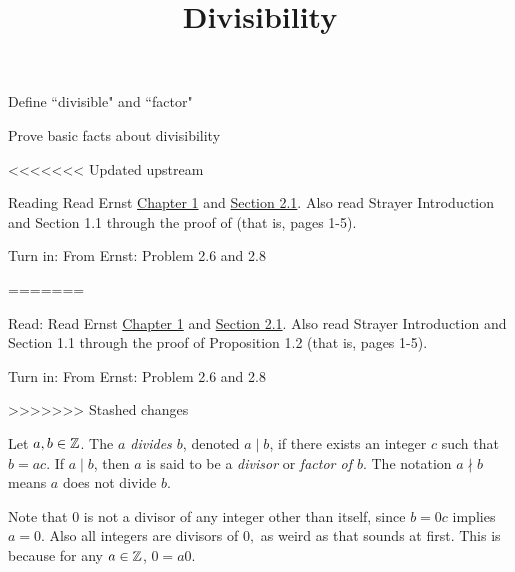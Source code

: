 \documentclass{ximera}
\title{Divisibility}
\begin{document}
\begin{abstract}
\end{abstract}
\maketitle


\begin{obj}
  \item Define ``divisible" and ``factor"
  \item Prove basic facts about divisibility
\end{obj}
 

<<<<<<< Updated upstream
\begin{instructorNotes}
  \begin{pre}
    \item[Reading]  Read Ernst  \href{https://danaernst.com/IBL-IntroToProof/pretext/chap_intro.html}{Chapter 1} and \href{https://danaernst.com/IBL-IntroToProof/pretext/sec_baby_number_theory.html}{Section 2.1}. Also read Strayer Introduction and Section 1.1 through the proof of  (that is, pages 1-5).
  
    \item[Turn in:] From Ernst: Problem 2.6 and 2.8
  \end{pre}
\end{instructorNotes}
=======
\begin{pre}
  \item[Read:]  Read Ernst  \href{https://danaernst.com/IBL-IntroToProof/pretext/chap_intro.html}{Chapter 1} and \href{https://danaernst.com/IBL-IntroToProof/pretext/sec_baby_number_theory.html}{Section 2.1}. Also read Strayer Introduction and Section 1.1 through the proof of Proposition 1.2 (that is, pages 1-5).
  
  \item[Turn in:] From Ernst: Problem 2.6 and 2.8
\end{pre}
>>>>>>> Stashed changes


\begin{defn}[$a$ divides $b$]\label{defn:divides}
  Let $a,b\in \mathbb Z$. The \emph{$a$ divides $b$}, denoted $a\mid b$,  if there exists an integer $c$ such that $b=ac$. 
  If $a\mid b$, then $a$ is said to be a \emph{divisor} or \emph{factor of $b$}. The notation $a\nmid b$ means $a$ does not divide $b$.
\end{defn}

Note that $0$ is not a divisor of any integer other than itself, since $b=0c$ implies $a=0$. Also all integers are divisors of $0,$ as weird as that sounds at first. This is because for any $a\in\mathbb Z$, $0=a0$.
\end{document}
